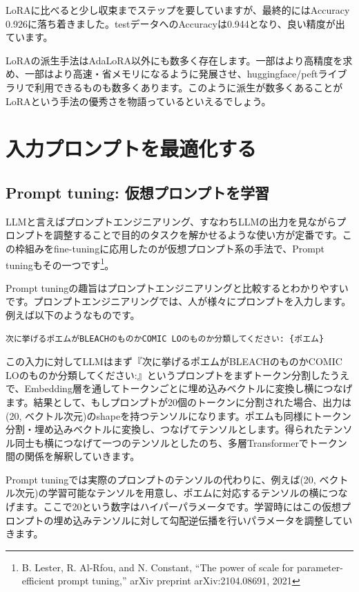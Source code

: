 \documentclass[a5paper,twoside,dvipdfmx]{jsarticle}
\begin{document}
LoRAに比べると少し収束までステップを要していますが、最終的にはAccuracy 0.926に落ち着きました。testデータへのAccuracyは0.944となり、良い精度が出ています。

LoRAの派生手法はAdaLoRA以外にも数多く存在します。一部はより高精度を求め、一部はより高速・省メモリになるように発展させ、huggingface/peftライブラリで利用できるものも数多くあります。このように派生が数多くあることがLoRAという手法の優秀さを物語っているといえるでしょう。

\newpage

\section{入力プロンプトを最適化する}

\subsection{Prompt tuning: 仮想プロンプトを学習}

LLMと言えばプロンプトエンジニアリング、すなわちLLMの出力を見ながらプロンプトを調整することで目的のタスクを解かせるような使い方が定番です。この枠組みをfine-tuningに応用したのが仮想プロンプト系の手法で、\textsf{Prompt tuning}もその一つです\footnote{B. Lester, R. Al-Rfou, and N. Constant, “The power of scale for parameter-efficient prompt tuning,” arXiv preprint arXiv:2104.08691, 2021}。

Prompt tuningの趣旨はプロンプトエンジニアリングと比較するとわかりやすいです。プロンプトエンジニアリングでは、人が様々にプロンプトを入力します。例えば以下のようなものです。

\begin{lstlisting}
次に挙げるポエムがBLEACHのものかCOMIC LOのものか分類してください: {ポエム}
\end{lstlisting}

この入力に対してLLMはまず『次に挙げるポエムがBLEACHのものかCOMIC LOのものか分類してください:』というプロンプトをまずトークン分割したうえで、Embedding層を通してトークンごとに埋め込みベクトルに変換し横につなげます。結果として、もしプロンプトが20個のトークンに分割された場合、出力は(20, ベクトル次元)のshapeを持つテンソルになります。ポエムも同様にトークン分割・埋め込みベクトルに変換し、つなげてテンソルとします。得られたテンソル同士も横につなげて一つのテンソルとしたのち、多層Transformerでトークン間の関係を解釈していきます。

Prompt tuningでは実際のプロンプトのテンソルの代わりに、例えば(20, ベクトル次元)の学習可能なテンソルを用意し、ポエムに対応するテンソルの横につなげます。ここで20という数字はハイパーパラメータです。学習時にはこの仮想プロンプトの埋め込みテンソルに対して勾配逆伝播を行いパラメータを調整していきます。%
\end{document}
